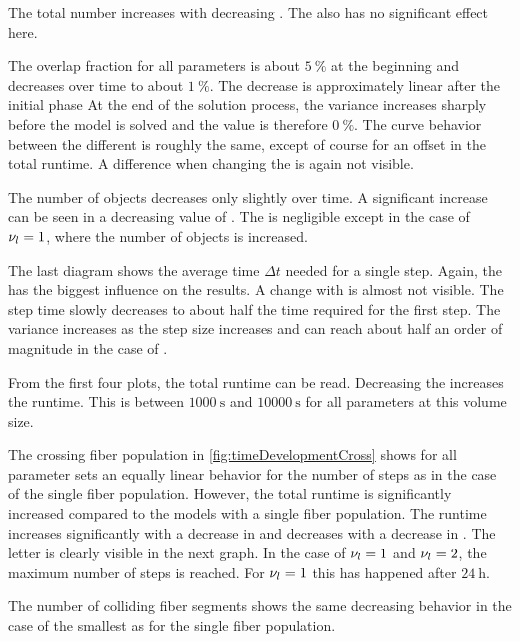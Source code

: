 The total number increases with decreasing \segLengthFactor{}.
The \segRadiusFactor{} also has no significant effect here.
\par
%
The overlap fraction for all parameters is about $\SI{5}{\percent}$ at the beginning and decreases over time to about $\SI{1}{\percent}$.
The decrease is approximately linear after the initial phase
At the end of the solution process, the variance increases sharply before the model is solved and the value is therefore $\SI{0}{\percent}$.
The curve behavior between the different \segLengthFactor{} is roughly the same, except of course for an offset in the total runtime.
A difference when changing the \segRadiusFactor{} is again not visible.
\par
%
The number of objects decreases only slightly over time.
A significant increase can be seen in a decreasing value of \segLengthFactor{}.
The \segRadiusFactor{} is negligible except in the case of $\textnormal{$\nu_{l}$} = \SI{1}{}$, where the number of objects is increased.
\par
%
The last diagram shows the average time $\Delta t$ needed for a single step.
Again, the \segLengthFactor{} has the biggest influence on the results.
A change with \segRadiusFactor{} is almost not visible.
The step time slowly decreases to about half the time required for the first step.
The variance increases as the step size increases and can reach about half an order of magnitude in the case of \segLengthFactor{}.
\par
%
From the first four plots, the total runtime can be read.
Decreasing the \segLengthFactor{} increases the runtime.
This is between $\SI{1000}{\second}$ and $\SI{10000}{\second}$ for all parameters at this volume size.
\par
%
The crossing fiber population in \cref{fig:timeDevelopmentCross} shows for all parameter sets an equally linear behavior for the number of steps as in the case of the single fiber population.
However, the total runtime is significantly increased compared to the models with a single fiber population.
The runtime increases significantly with a decrease in \segLengthFactor{} and decreases with a decrease in \segRadiusFactor{}.
The letter is clearly visible in the next graph.
In the case of $\textnormal{$\nu_{l}$} = \SI{1}{}$ and $\textnormal{$\nu_{l}$} = \SI{2}{}$, the maximum number of steps is reached.
For $\textnormal{$\nu_{l}$} = \SI{1}{}$ this has happened after $\SI{24}{\hour}$.
\par
%
The number of colliding fiber segments shows the same decreasing behavior in the case of the smallest \segRadiusFactor{} as for the single fiber population.
